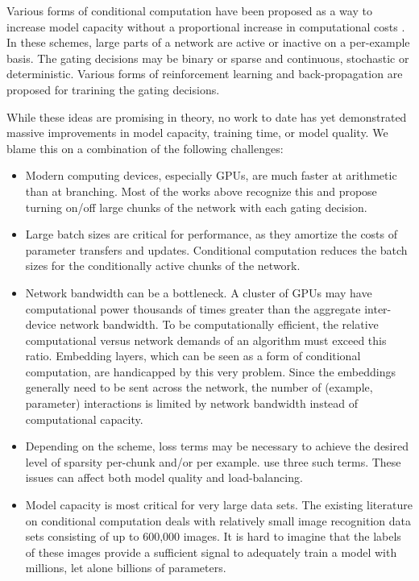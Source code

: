 \documentclass{article}
\begin{document}
Various forms of conditional computation have been proposed as a way to increase model capacity without a proportional increase in computational costs \citep{Davis13:CondComp, Bengio13:CondComp, eigen2013learning, Denoyer14:CondComp,  Cho14, Bengio15:CondComp, Almahairi15}.  In these schemes, large parts of a network are active or inactive on a per-example basis.  The gating decisions may be binary or sparse and continuous, stochastic or deterministic.  Various forms of reinforcement learning and back-propagation are proposed for trarining the gating decisions. 

While these ideas are promising in theory, no work to date has yet demonstrated massive improvements in model capacity, training time, or model quality.  We blame this on a combination of the following challenges:

\begin{itemize}
  \item Modern computing devices, especially GPUs, are much faster at arithmetic than at branching.   Most of the works above recognize this and propose turning on/off large chunks of the network with each gating decision.
  \item Large batch sizes are critical for performance, as they amortize the costs of parameter transfers and updates.  Conditional computation reduces the batch sizes for the conditionally active chunks of the network.
  \item Network bandwidth can be a bottleneck.  A cluster of GPUs may have computational power thousands of times greater than the aggregate inter-device network bandwidth.  To be computationally efficient, the relative computational versus network demands of an algorithm must exceed this ratio.   Embedding layers, which can be seen as a form of conditional computation, are handicapped by this very problem.  Since the embeddings generally need to be sent across the network, the number of (example, parameter) interactions is limited by network bandwidth instead of computational capacity.
  \item Depending on the scheme, loss terms may be necessary to achieve the desired level of sparsity per-chunk and/or per example. \cite{Bengio15:CondComp} use three such terms.  These issues can affect both model quality and load-balancing.
  \item Model capacity is most critical for very large data sets.  The existing literature on conditional computation deals with relatively small image recognition data sets consisting of up to 600,000 images.  It is hard to imagine that the labels of these images provide a sufficient signal to adequately train a model with millions, let alone billions of parameters.
\end{itemize}
 
\end{document}
